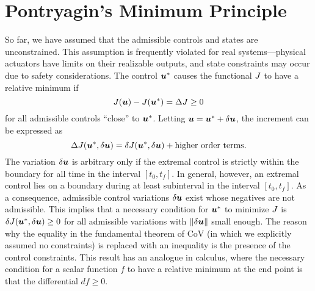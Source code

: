 \section{Pontryagin's Minimum Principle}

So far, we have assumed that the admissible controls and states are unconstrained. This assumption is frequently violated for real systems---physical actuators have limits on their realizable outputs, and state constraints may occur due to safety considerations. The control $\bm{u}^*$ causes the functional $J$ to have a relative minimum if
\begin{equation}
    J(\bm{u}) - J(\bm{u}^*) = \Delta J \geq 0
\end{equation}
for all admissible controls ``close'' to $\bm{u}^*$. Letting $\bm{u} = \bm{u}^* + \delta \bm{u}$, the increment can be expressed as
\begin{equation}
    \Delta J(\bm{u}^*,\delta\bm{u}) = \delta J(\bm{u}^*,\delta \bm{u}) + \text{higher order terms}.
\end{equation}
The variation $\delta \bm{u}$ is arbitrary only if the extremal control is strictly within the boundary for all time in the interval $[t_0,t_f]$. In general, however, an extremal control lies on a boundary during at least subinterval in the interval $[t_0,t_f]$.
As a consequence, admissible control variations $\delta \bm{u}$ exist whose negatives are not admissible. This implies that a necessary condition for $\bm{u}^*$ to minimize $J$ is $\delta J(\bm{u}^*, \delta \bm{u}) \geq 0$ for all admissible variations with $\|\delta \bm{u}\|$ small enough. The reason why the equality in the fundamental theorem of CoV (in which we explicitly assumed no constraints) is replaced with an inequality is the presence of the control constraints. This result has an analogue in calculus, where the necessary condition for a scalar function $f$ to have a relative minimum at the end point is that the differential $df \geq 0$.

